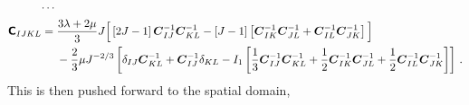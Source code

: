 \documentclass[10pt,letterpaper,oneside]{report}
\newcommand{\ten}[1]{\mbox{\boldmath $#1$}{}}
\newcommand{\tenf}[1]{\mbox{{\sffamily{\bfseries {#1}}}}}
\begin{document}
\begin{align}
\cdots{}& \notag \\
\tenf{C}_{IJKL} ={}& \frac{3 \lambda + 2 \mu}{3} J \Big[ \left[ 2J - 1 \right] \ten{C}^{-1}_{IJ} \ten{C}^{-1}_{KL} - \left[ J - 1 \right] \left[ \ten{C}^{-1}_{IK} \ten{C}^{-1}_{JL} + \ten{C}^{-1}_{IL} \ten{C}^{-1}_{JK} \right] \Big] \notag \\ & - \frac{2}{3} \mu  J^{-2/3} \left[ \delta_{IJ} \ten{C}^{-1}_{KL} + \ten{C}^{-1}_{IJ} \delta_{KL} - I_1 \left[ \frac{1}{3} \ten{C}^{-1}_{IJ} \ten{C}^{-1}_{KL} + \frac{1}{2} \ten{C}^{-1}_{IK} \ten{C}^{-1}_{JL} + \frac{1}{2} \ten{C}^{-1}_{IL} \ten{C}^{-1}_{JK} \right] \right] \, . 
\end{align}
This is then pushed forward to the spatial domain, 
\end{document}
